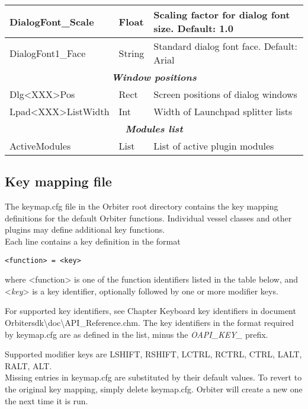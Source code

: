 \documentclass[Orbiter User Manual.tex]{subfiles}
\begin{document}
\begin{longtable}{ |p{}|p{}|p{}| }
	\hline\rule{0pt}{2ex}
	DialogFont\_Scale & Float & Scaling factor for dialog font size. Default: 1.0\\
	\hline\rule{0pt}{2ex}
	DialogFont1\_Face & String & Standard dialog font face. Default: Arial\\
	\hline
	\multicolumn{3}{|c|}{\rule{0pt}{2ex}\textbf{\textit{Window positions}}}\\
	\hline\rule{0pt}{2ex}
	Dlg<XXX>Pos & Rect & Screen positions of dialog windows\\
	\hline\rule{0pt}{2ex}
	Lpad<XXX>ListWidth & Int & Width of Launchpad splitter lists\\
	\hline
	\multicolumn{3}{|c|}{\rule{0pt}{2ex}\textbf{\textit{Modules list}}}\\
	\hline\rule{0pt}{2ex}
	ActiveModules & List & List of active plugin modules\\
	\hline
	\end{longtable}


\subsection{Key mapping file}
The keymap.cfg file in the Orbiter root directory contains the key mapping definitions for the default Orbiter functions. Individual vessel classes and other plugins may define additional key functions.\\
Each line contains a key definition in the format

\begin{lstlisting}[language=OSFS]
<function> = <key>
\end{lstlisting}

\noindent
where <function> is one of the function identifiers listed in the table below, and <\textit{key}> is a key identifier, optionally followed by one or more modifier keys.
\begin{sloppypar}%
\noindent
For supported key identifiers, see Chapter Keyboard key identifiers in document Orbitersdk\textbackslash doc\textbackslash API\_Reference.chm. The key identifiers in the format required by keymap.cfg are as defined in the list, minus the \textit{OAPI\_KEY\_} prefix.
\end{sloppypar}
\noindent
Supported modifier keys are LSHIFT, RSHIFT, LCTRL, RCTRL, CTRL, LALT, RALT, ALT.\\
Missing entries in keymap.cfg are substituted by their default values. To revert to the original key mapping, simply delete keymap.cfg. Orbiter will create a new one the next time it is run.
\end{document}

